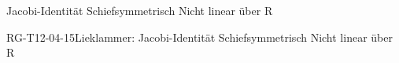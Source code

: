 Jacobi-Identität
Schiefsymmetrisch
Nicht linear über R

\begin{REM}{RG-T12-04-15}{Lieklammer:
Jacobi-Identität
Schiefsymmetrisch
Nicht linear über R}
\end{REM}
